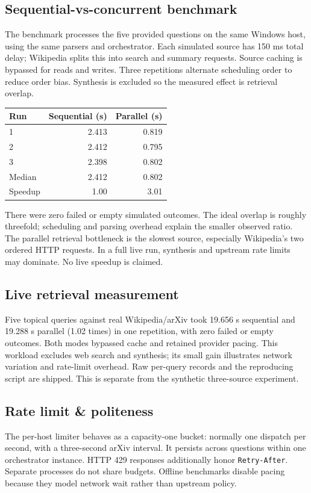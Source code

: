 \documentclass[11pt,a4paper]{article}
\begin{document}
\subsection{Sequential-vs-concurrent benchmark}
The benchmark processes the five provided questions on the same Windows host, using the same parsers and orchestrator. Each simulated source has 150 ms total delay; Wikipedia splits this into search and summary requests. Source caching is bypassed for reads and writes. Three repetitions alternate scheduling order to reduce order bias. Synthesis is excluded so the measured effect is retrieval overlap.
\begin{center}
\begin{tabular}{lrr}\toprule
Run & Sequential (s) & Parallel (s)\\\midrule
1 & 2.413 & 0.819\\
2 & 2.412 & 0.795\\
3 & 2.398 & 0.802\\
\midrule Median & 2.412 & 0.802\\
Speedup & 1.00 & 3.01\\\bottomrule
\end{tabular}
\end{center}
There were zero failed or empty simulated outcomes. The ideal overlap is roughly threefold; scheduling and parsing overhead explain the smaller observed ratio. The parallel retrieval bottleneck is the slowest source, especially Wikipedia's two ordered HTTP requests. In a full live run, synthesis and upstream rate limits may dominate. No live speedup is claimed.

\subsection{Live retrieval measurement}
Five topical queries against real Wikipedia/arXiv took 19.656 s sequential and 19.288 s parallel (1.02 times) in one repetition, with zero failed or empty outcomes. Both modes bypassed cache and retained provider pacing. This workload excludes web search and synthesis; its small gain illustrates network variation and rate-limit overhead. Raw per-query records and the reproducing script are shipped. This is separate from the synthetic three-source experiment.



\subsection{Rate limit \& politeness}
The per-host limiter behaves as a capacity-one bucket: normally one dispatch per second, with a three-second arXiv interval. It persists across questions within one orchestrator instance. HTTP 429 responses additionally honor \texttt{Retry-After}. Separate processes do not share budgets. Offline benchmarks disable pacing because they model network wait rather than upstream policy.
\end{document}

